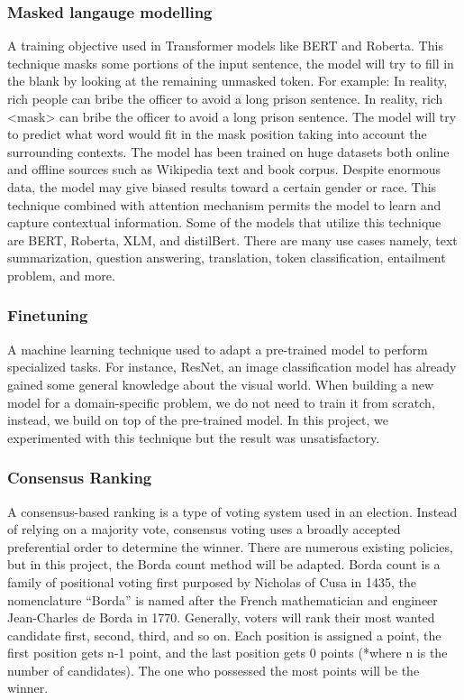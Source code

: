 \documentclass[12pt,oneside,openright,a4paper]{cpe-english-project}
\begin{document}
\subsubsection{Masked langauge modelling}
A training objective used in Transformer models like BERT and Roberta. This technique masks some portions of the input sentence, the model will try to fill in the blank by looking at the remaining unmasked token. For example: 
In reality, rich people can bribe the officer to avoid a long prison sentence.
In reality, rich <mask> can bribe the officer to avoid a long prison sentence.
The model will try to predict what word would fit in the mask position taking into account the surrounding contexts. The model has been trained on huge datasets both online and offline sources such as Wikipedia text and book corpus. Despite enormous data, the model may give biased results toward a certain gender or race.
This technique combined with attention mechanism permits the model to learn and capture contextual information. Some of the models that utilize this technique are BERT, Roberta, XLM, and distilBert. There are many use cases namely, text summarization, question answering, translation, token classification, entailment problem, and more.


\subsubsection{Finetuning}
A machine learning technique used to adapt a pre-trained model to perform specialized tasks. For instance, ResNet, an image classification model has already gained some general knowledge about the visual world. When building a new model for a domain-specific problem, we do not need to train it from scratch, instead, we build on top of the pre-trained model. In this project, we experimented with this technique but the result was unsatisfactory. 

\subsubsection{Consensus Ranking}
A consensus-based ranking is a type of voting system used in an election. Instead of relying on a majority vote, consensus voting uses a broadly accepted preferential order to determine the winner. There are numerous existing policies, but in this project, the Borda count method will be adapted. Borda count is a family of positional voting first purposed by Nicholas of Cusa in 1435, the nomenclature “Borda” is named after the French mathematician and engineer Jean-Charles de Borda in 1770. Generally, voters will rank their most wanted candidate first, second, third, and so on. Each position is assigned a point, the first position gets n-1 point, and the last position gets 0 points (*where n is the number of candidates). The one who possessed the most points will be the winner.
\end{document}
